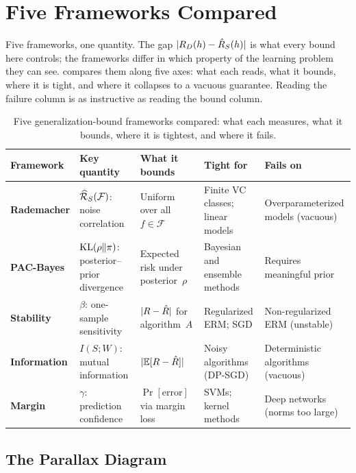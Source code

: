 \section{Five Frameworks Compared}
\label{sec:comparison}

Five frameworks, one quantity. The gap $|R_D(h) - \hat{R}_S(h)|$ is what every bound here controls; the frameworks differ in which property of the learning problem they can see.  compares them along five axes: what each reads, what it bounds, where it is tight, and where it collapses to a vacuous guarantee. Reading the failure column is as instructive as reading the bound column.

\begin{table}[ht]
\centering\small
\caption[Five generalization-bound frameworks compared.]{Five
generalization-bound frameworks compared: what each measures, what it
bounds, where it is tightest, and where it fails.}
\label{tab:five-frameworks}
\renewcommand{\arraystretch}{1.4}
\begin{tabularx}{\textwidth}{>{\bfseries\small}l X X X X}
\toprule
\textbf{Framework} & \textbf{Key quantity} & \textbf{What it bounds}
  & \textbf{Tight for} & \textbf{Fails on} \\
\midrule
Rademacher
  & $\widehat{\mathcal{R}}_S(\mathcal{F})$: noise correlation
  & Uniform over all $f \in \mathcal{F}$
  & Finite VC classes; linear models
  & Overparameterized models (vacuous) \\
\addlinespace
PAC-Bayes
  & $\mathrm{KL}(\rho \| \pi)$: posterior--prior divergence
  & Expected risk under posterior~$\rho$
  & Bayesian and ensemble methods
  & Requires meaningful prior \\
\addlinespace
Stability
  & $\beta$: one-sample sensitivity
  & $|R - \hat{R}|$ for algorithm~$A$
  & Regularized ERM; SGD
  & Non-regularized ERM (unstable) \\
\addlinespace
Information
  & $I(S; W)$: mutual information
  & $|\mathbb{E}[R - \hat{R}]|$
  & Noisy algorithms (DP-SGD)
  & Deterministic algorithms (vacuous) \\
\addlinespace
Margin
  & $\gamma$: prediction confidence
  & $\Pr[\text{error}]$ via margin loss
  & SVMs; kernel methods
  & Deep networks (norms too large) \\
\bottomrule
\end{tabularx}
\end{table}


\subsection{The Parallax Diagram}

